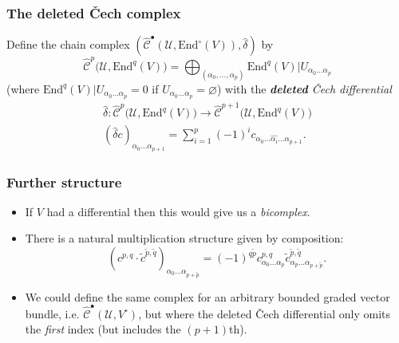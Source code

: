 \documentclass{beamer}
\begin{document}
            \begin{frame}\frametitle{The deleted Čech complex}
                \begin{definition}
                    Define the chain complex $(\hat{\mathscr{C}}^\bullet(\mathcal{U},\mathrm{End}^\circ(V)),\hat{\delta})$ by
                    \begin{equation*}
                        \hat{\mathscr{C}}^p\big(\mathcal{U},\mathrm{End}^q(V)\big) = \bigoplus_{(\alpha_0,\ldots,\alpha_p)} \mathrm{End}^q(V)|U_{\alpha_0\ldots\alpha_p}
                    \end{equation*}
                    (where $\mathrm{End}^q(V)|U_{\alpha_0\ldots\alpha_p}=0$ if $U_{\alpha_0\ldots\alpha_p}=\varnothing$) with the \emph{\textbf{deleted} Čech differential}
                    \begin{gather*}
                        \hat{\delta} \colon \hat{\mathscr{C}}^p\big(\mathcal{U},\mathrm{End}^q(V)\big) \to \hat{\mathscr{C}}^{p+1}\big(\mathcal{U},\mathrm{End}^q(V)\big)\\
                        (\hat{\delta}c)_{\alpha_0\ldots\alpha_{p+1}} = \sum_{i=1}^p (-1)^i c_{\alpha_0\ldots\widehat{\alpha_i}\ldots\alpha_{p+1}}.
                    \end{gather*}
                \end{definition}
            \end{frame}

            \begin{frame}\frametitle{Further structure}
                \begin{itemize}
                    \item If $V$ had a differential then this would give us a \emph{bicomplex}.
                    \pause
                    \item There is a natural multiplication structure given by composition:
                        \begin{equation*}
                            (c^{p,q}\cdot \tilde{c}^{\tilde{p},\tilde{q}})_{\alpha_0\ldots\alpha_{p+\tilde{p}}} = (-1)^{q\tilde{p}} c_{\alpha_0\ldots\alpha_p}^{p,q} \tilde{c}_{\alpha_p\ldots\alpha_{p+\tilde{p}}}^{\tilde{p},\tilde{q}}.
                        \end{equation*}
                    \pause
                    \item We could define the same complex for an arbitrary bounded graded vector bundle, i.e. $\hat{\mathscr{C}}^\bullet(\mathcal{U},V^\circ)$, but where the deleted Čech differential only omits the \emph{first} index (but includes the $(p+1)$th).
                \end{itemize}
            \end{frame}
\end{document}
